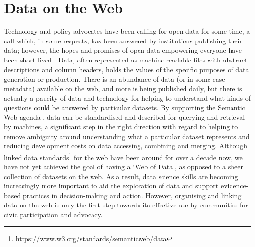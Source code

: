 \section{Data on the Web}
\label{sec:data_web}
Technology and policy advocates have been calling for open data for some time, a call which, in some respects, has been answered by institutions publishing their data; however, the hopes and promises of open data empowering everyone have been short-lived \citep{davies_state_2019}. Data, often represented as machine-readable files with abstract descriptions and column headers, holds the values of the specific purposes of data generation or production. There is an abundance of data (or in some case metadata) available on the web, and more is being published daily, but there is actually a paucity of data and technology for helping to understand what kinds of questions could be answered by particular datasets. By supporting the Semantic Web agenda \citep{berners-lee_semantic_2001}, data can be standardised and described for querying and retrieval by machines, a significant step in the right direction with regard to helping to remove ambiguity around understanding what a particular dataset represents and reducing development costs on data accessing, combining and merging. Although linked data standards\footnote{\url{https://www.w3.org/standards/semanticweb/data}} for the web have been around for over a decade now, we have not yet achieved the goal of having a `Web of Data', as opposed to a sheer collection of datasets on the web. As a result, data science skills are becoming increasingly more important to aid the exploration of data and support evidence-based practices in decision-making and action. However, organising and linking data on the web is only the first step towards its effective use by communities for civic participation and advocacy.

